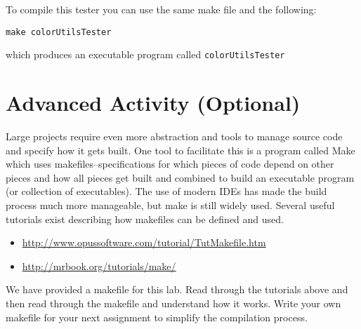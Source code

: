 \documentclass[12pt]{scrartcl}
\begin{document}
To compile this tester you can use the same make file and the
following:

\texttt{make colorUtilsTester}

which produces an executable program called \texttt{colorUtilsTester}

\section{Advanced Activity (Optional)}

Large projects require even more abstraction and tools to manage 
source code and specify how it gets built.  One tool to facilitate this 
is a program called Make which uses makefiles--specifications for 
which pieces of code depend on other pieces and how all pieces 
get built and combined to build an executable program (or collection 
of executables).  The use of modern IDEs has made the build process 
much more manageable, but make is still widely used.  Several 
useful tutorials exist describing how makefiles can be defined and 
used.
\begin{itemize}
  \item \url{http://www.opussoftware.com/tutorial/TutMakefile.htm}
  \item \url{http://mrbook.org/tutorials/make/}
\end{itemize}
We have provided a makefile for this lab.  Read through the tutorials
above and then read through the makefile and understand how it works.
Write your own makefile for your next assignment to simplify the
compilation process.
\end{document}
